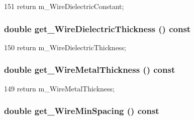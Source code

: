 \begin{DoxyCode}
151 { return m_WireDielectricConstant; }
\end{DoxyCode}
\hypertarget{classTechParameter_a9a19b59fa12b77c8941b600850dc48e3}{
\subsubsection[{get\_\-WireDielectricThickness}]{\setlength{\rightskip}{0pt plus 5cm}double get\_\-WireDielectricThickness () const}}
\label{classTechParameter_a9a19b59fa12b77c8941b600850dc48e3}



\begin{DoxyCode}
150 { return m_WireDielectricThickness; }
\end{DoxyCode}
\hypertarget{classTechParameter_ad1049c00d11342d2bb09cb06f719110b}{
\subsubsection[{get\_\-WireMetalThickness}]{\setlength{\rightskip}{0pt plus 5cm}double get\_\-WireMetalThickness () const}}
\label{classTechParameter_ad1049c00d11342d2bb09cb06f719110b}



\begin{DoxyCode}
149 { return m_WireMetalThickness; }
\end{DoxyCode}
\hypertarget{classTechParameter_af8c4a3ffdd1717cfc0c6374a5ff9f240}{
\subsubsection[{get\_\-WireMinSpacing}]{\setlength{\rightskip}{0pt plus 5cm}double get\_\-WireMinSpacing () const}}
\label{classTechParameter_af8c4a3ffdd1717cfc0c6374a5ff9f240}



